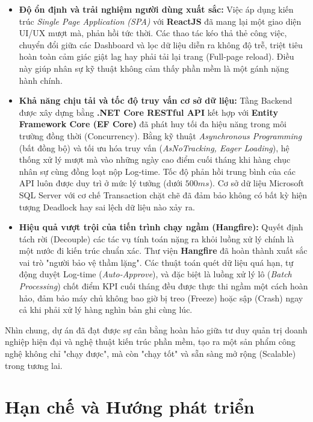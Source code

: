 \documentclass[a4paper,13.5pt]{extreport}
\begin{document}
\begin{itemize}
    \item \textbf{Độ ổn định và trải nghiệm người dùng xuất sắc:} Việc áp dụng kiến trúc \textit{Single Page Application (SPA)} với \textbf{ReactJS} đã mang lại một giao diện UI/UX mượt mà, phản hồi tức thời. Các thao tác kéo thả thẻ công việc, chuyển đổi giữa các Dashboard và lọc dữ liệu diễn ra không độ trễ, triệt tiêu hoàn toàn cảm giác giật lag hay phải tải lại trang (Full-page reload). Điều này giúp nhân sự kỹ thuật không cảm thấy phần mềm là một gánh nặng hành chính.
    \item \textbf{Khả năng chịu tải và tốc độ truy vấn cơ sở dữ liệu:} Tầng Backend được xây dựng bằng \textbf{.NET Core RESTful API} kết hợp với \textbf{Entity Framework Core (EF Core)} đã phát huy tối đa hiệu năng trong môi trường đồng thời (Concurrency). Bằng kỹ thuật \textit{Asynchronous Programming} (bất đồng bộ) và tối ưu hóa truy vấn (\textit{AsNoTracking, Eager Loading}), hệ thống xử lý mượt mà vào những ngày cao điểm cuối tháng khi hàng chục nhân sự cùng đồng loạt nộp Log-time. Tốc độ phản hồi trung bình của các API luôn được duy trì ở mức lý tưởng (dưới $500ms$). Cơ sở dữ liệu Microsoft SQL Server với cơ chế Transaction chặt chẽ đã đảm bảo không có bất kỳ hiện tượng Deadlock hay sai lệch dữ liệu nào xảy ra.
    \item \textbf{Hiệu quả vượt trội của tiến trình chạy ngầm (Hangfire):} Quyết định tách rời (Decouple) các tác vụ tính toán nặng ra khỏi luồng xử lý chính là một nước đi kiến trúc chuẩn xác. Thư viện \textbf{Hangfire} đã hoàn thành xuất sắc vai trò "người bảo vệ thầm lặng". Các thuật toán quét dữ liệu quá hạn, tự động duyệt Log-time (\textit{Auto-Approve}), và đặc biệt là luồng xử lý lô (\textit{Batch Processing}) chốt điểm KPI cuối tháng đều được thực thi ngầm một cách hoàn hảo, đảm bảo máy chủ không bao giờ bị treo (Freeze) hoặc sập (Crash) ngay cả khi phải xử lý hàng nghìn bản ghi cùng lúc.
\end{itemize}

Nhìn chung, dự án đã đạt được sự cân bằng hoàn hảo giữa tư duy quản trị doanh nghiệp hiện đại và nghệ thuật kiến trúc phần mềm, tạo ra một sản phẩm công nghệ không chỉ "chạy được", mà còn "chạy tốt" và sẵn sàng mở rộng (Scalable) trong tương lai.

\section{Hạn chế và Hướng phát triển}
\end{document}
